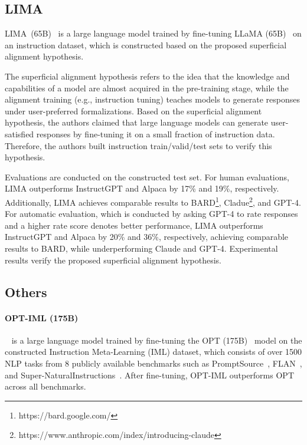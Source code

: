 \documentclass[11pt]{article}
\begin{document}
\subsection{LIMA}
LIMA~(65B)~\citep{Zhou2023LIMALI} is a large language model trained by fine-tuning LLaMA (65B)~\citep{Touvron2023LLaMAOA} on an instruction dataset, which is constructed based on the proposed superficial alignment hypothesis. 

The superficial alignment hypothesis refers to the idea that the knowledge and capabilities of a model are almost acquired in the pre-training stage, while the alignment training (e.g., instruction tuning) teaches models to generate responses under user-preferred formalizations. Based on the superficial alignment hypothesis, the authors claimed that large language models can generate user-satisfied responses by fine-tuning it on a small fraction of instruction data. Therefore, the authors built instruction train/valid/test sets to verify this hypothesis. 


Evaluations are conducted on the constructed test set. 
For human evaluations, LIMA outperforms InstructGPT and Alpaca by 17\% and 19\%, respectively. Additionally, LIMA achieves comparable results to BARD\footnote{https://bard.google.com/}, Cladue\footnote{https://www.anthropic.com/index/introducing-claude}, and GPT-4. For automatic evaluation, which is conducted by asking GPT-4 to rate responses and a higher rate score denotes better performance, LIMA outperforms InstructGPT and Alpaca by 20\% and 36\%, respectively, achieving comparable results to BARD, while underperforming Claude and GPT-4. Experimental results verify the proposed superficial alignment hypothesis. 



\subsection{Others}
\paragraph{OPT-IML (175B)}~\citep{Iyer2022OPTIMLSL} is a large language model trained by fine-tuning the OPT (175B)~\citep{Zhang2022OPTOP} model on the constructed Instruction Meta-Learning (IML) dataset, which consists of over 1500 NLP tasks from 8 publicly available benchmarks such as PromptSource~\citep{Bach2022PromptSourceAI}, FLAN~\citep{longpre2023flan}, and Super-NaturalInstructions~\citep{wang2022super}. After fine-tuning, OPT-IML outperforms OPT across all benchmarks. 
\end{document}
